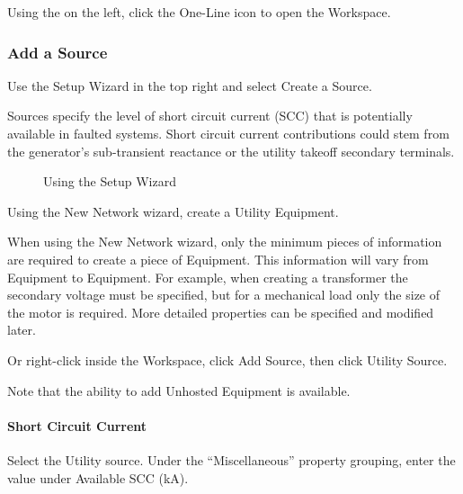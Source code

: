 \documentclass[letterpaper,10pt,english]{sphinxmanual}
\begin{document}
Using the {\hyperref[\detokenize{docs/userguide/index-user_guide:workspace-toolbar}]{}} on the left, click the One-Line icon to open the Workspace.

\ignorespaces 

\subsubsection{Add a Source}
\label{\detokenize{docs/userguide/buildingelectricalmodel/one-line/index-one-line:add-a-source}}\label{\detokenize{docs/userguide/buildingelectricalmodel/one-line/index-one-line:one-line-adding-a-source}}\label{\detokenize{docs/userguide/buildingelectricalmodel/one-line/index-one-line:index-0}}\label{\detokenize{docs/userguide/buildingelectricalmodel/one-line/index-one-line::doc}}
Use the Setup Wizard in the top right and select Create a Source.

Sources specify the level of short circuit current (SCC) that is potentially available in faulted systems.  Short circuit current contributions could stem from the generator’s sub-transient reactance or the utility takeoff secondary terminals.

\begin{figure}[H]
\centering
\capstart

\noindent{}
\caption{Using the Setup Wizard}\label{\detokenize{docs/userguide/buildingelectricalmodel/one-line/index-one-line:id2}}\end{figure}

Using the New Network wizard, create a Utility Equipment.

When using the New Network wizard, only the minimum pieces of information are required to create a piece of Equipment.  This information will vary from Equipment to Equipment.  For example, when creating a transformer the secondary voltage must be specified, but for a mechanical load only the size of the motor is required.  More detailed properties can be specified and modified later.

Or right-click inside the Workspace, click Add Source, then click Utility Source.

Note that the ability to add Unhosted Equipment is available.


\paragraph{Short Circuit Current}
\label{\detokenize{docs/userguide/buildingelectricalmodel/one-line/index-one-line:short-circuit-current}}\label{\detokenize{docs/userguide/buildingelectricalmodel/one-line/index-one-line:one-line-scc}}
Select the Utility source.  Under the “Miscellaneous” property grouping, enter the value under Available SCC (kA).
\end{document}

